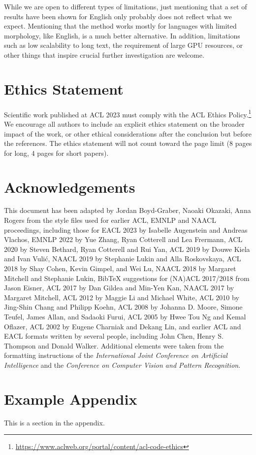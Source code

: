 \documentclass[11pt]{article}
\begin{document}
While we are open to different types of limitations, just mentioning that a set of results have been shown for English only probably does not reflect what we expect. 
Mentioning that the method works mostly for languages with limited morphology, like English, is a much better alternative.
In addition, limitations such as low scalability to long text, the requirement of large GPU resources, or other things that inspire crucial further investigation are welcome.

\section*{Ethics Statement}
Scientific work published at ACL 2023 must comply with the ACL Ethics Policy.\footnote{\url{https://www.aclweb.org/portal/content/acl-code-ethics}} We encourage all authors to include an explicit ethics statement on the broader impact of the work, or other ethical considerations after the conclusion but before the references. The ethics statement will not count toward the page limit (8 pages for long, 4 pages for short papers).

\section*{Acknowledgements}
This document has been adapted by Jordan Boyd-Graber, Naoaki Okazaki, Anna Rogers from the style files used for earlier ACL, EMNLP and NAACL proceedings, including those for
EACL 2023 by Isabelle Augenstein and Andreas Vlachos,
EMNLP 2022 by Yue Zhang, Ryan Cotterell and Lea Frermann,
ACL 2020 by Steven Bethard, Ryan Cotterell and Rui Yan,
ACL 2019 by Douwe Kiela and Ivan Vuli\'{c},
NAACL 2019 by Stephanie Lukin and Alla Roskovskaya, 
ACL 2018 by Shay Cohen, Kevin Gimpel, and Wei Lu, 
NAACL 2018 by Margaret Mitchell and Stephanie Lukin,
Bib\TeX{} suggestions for (NA)ACL 2017/2018 from Jason Eisner,
ACL 2017 by Dan Gildea and Min-Yen Kan, NAACL 2017 by Margaret Mitchell, 
ACL 2012 by Maggie Li and Michael White, 
ACL 2010 by Jing-Shin Chang and Philipp Koehn, 
ACL 2008 by Johanna D. Moore, Simone Teufel, James Allan, and Sadaoki Furui, 
ACL 2005 by Hwee Tou Ng and Kemal Oflazer, 
ACL 2002 by Eugene Charniak and Dekang Lin, 
and earlier ACL and EACL formats written by several people, including
John Chen, Henry S. Thompson and Donald Walker.
Additional elements were taken from the formatting instructions of the \emph{International Joint Conference on Artificial Intelligence} and the \emph{Conference on Computer Vision and Pattern Recognition}.




\appendix

\section{Example Appendix}
\label{sec:appendix}

This is a section in the appendix.
\end{document}
